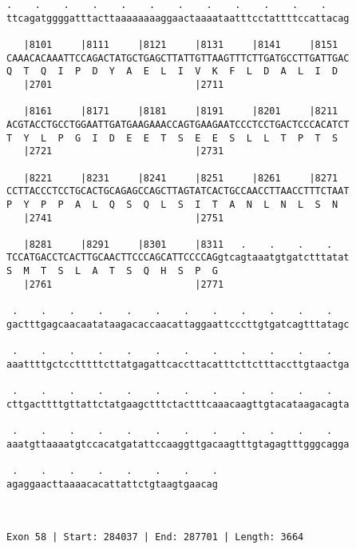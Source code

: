 \documentclass{article}
\begin{document}
\begin{Verbatim}
.    .    .    .    .    .    .    .    .    .    .    .    
ttcagatggggatttacttaaaaaaaaggaactaaaataatttcctattttccattacag
                                                            
   |8101     |8111     |8121     |8131     |8141     |8151  
CAAACACAAATTCCAGACTATGCTGAGCTTATTGTTAAGTTTCTTGATGCCTTGATTGAC
Q  T  Q  I  P  D  Y  A  E  L  I  V  K  F  L  D  A  L  I  D  
   |2701                         |2711                      
  
   |8161     |8171     |8181     |8191     |8201     |8211  
ACGTACCTGCCTGGAATTGATGAAGAAACCAGTGAAGAATCCCTCCTGACTCCCACATCT
T  Y  L  P  G  I  D  E  E  T  S  E  E  S  L  L  T  P  T  S  
   |2721                         |2731                      
  
   |8221     |8231     |8241     |8251     |8261     |8271  
CCTTACCCTCCTGCACTGCAGAGCCAGCTTAGTATCACTGCCAACCTTAACCTTTCTAAT
P  Y  P  P  A  L  Q  S  Q  L  S  I  T  A  N  L  N  L  S  N  
   |2741                         |2751                      
  
   |8281     |8291     |8301     |8311   .    .    .    .   
TCCATGACCTCACTTGCAACTTCCCAGCATTCCCCAGgtcagtaaatgtgatctttatat
S  M  T  S  L  A  T  S  Q  H  S  P  G                       
   |2761                         |2771                      
  
 .    .    .    .    .    .    .    .    .    .    .    .   
gactttgagcaacaatataagacaccaacattaggaattcccttgtgatcagtttatagc
                                                            
 .    .    .    .    .    .    .    .    .    .    .    .   
aaattttgctcctttttcttatgagattcaccttacatttcttctttaccttgtaactga
                                                            
 .    .    .    .    .    .    .    .    .    .    .    .   
cttgacttttgttattctatgaagctttctactttcaaacaagttgtacataagacagta
                                                            
 .    .    .    .    .    .    .    .    .    .    .    .   
aaatgttaaaatgtccacatgatattccaaggttgacaagtttgtagagtttgggcagga
                                                            
 .    .    .    .    .    .    .    .
agaggaacttaaaacacattattctgtaagtgaacag
                                     
                                     
 
Exon 58 | Start: 284037 | End: 287701 | Length: 3664




\end{Verbatim}
\end{document}
